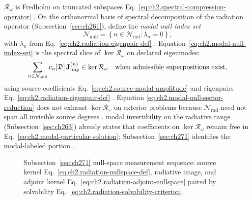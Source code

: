\(\mathcal{R}_\omega\) is Fredholm on truncated subspaces
Eq.~\eqref{eq:ch2.spectral-compression-operator} \cite{harrington2001}.
On the orthonormal basis of spectral decomposition of the radiation operator (Subsection~\ref{sec:ch261}), define
the \emph{modal null index set}
\begin{equation}
\label{eq:ch2.modal-null-index-set}
\mathcal{N}_{\mathrm{null}}
=
\left\{
n\in\mathcal{N}_{\mathrm{rad}}:
\lambda_n=0
\right\},
\end{equation}
with \(\lambda_n\) from Eq.~\eqref{eq:ch2.radiation-eigenpair-def}
\cite{stratton1941}. Equation~\eqref{eq:ch2.modal-null-index-set} is the
spectral slice of \(\ker\mathcal{R}_\omega\) on declared eigenmodes:
\begin{equation}
\label{eq:ch2.modal-null-sector-reduction}
\sum_{n\in\mathcal{N}_{\mathrm{null}}}
c_n[\mathfrak{D}]\,\mathbf{J}_{\mathrm{imp}}^{(n)}
\in\ker\mathcal{R}_\omega
\quad\text{when admissible superpositions exist},
\end{equation}
using source coefficients Eq.~\eqref{eq:ch2.source-modal-amplitude} and eigenpairs
Eq.~\eqref{eq:ch2.radiation-eigenpair-def} \cite{stratton1941}. Equation
\eqref{eq:ch2.modal-null-sector-reduction} does not exhaust \(\ker\mathcal{R}_\omega\) on
exterior problems because \(\mathcal{N}_{\mathrm{rad}}\) need not span all invisible source
degrees \cite{harrington2001}. modal invertibility on the radiative range (Subsection~\ref{sec:ch263})
already states that coefficients on \(\ker\mathcal{R}_\omega\) remain free in
Eq.~\eqref{eq:ch2.modal-particular-solution}; Subsection~\ref{sec:ch271} identifies the
modal-labeled portion \cite{stratton1941}.
\begin{figure}[t]
\centering
{}
\caption{Subsection~\ref{sec:ch271} null-space measurement sequence: source kernel
Eq.~\eqref{eq:ch2.radiation-nullspace-def}, radiative image, and adjoint kernel
Eq.~\eqref{eq:ch2.radiation-adjoint-nullspace} paired by solvability
Eq.~\eqref{eq:ch2.radiation-solvability-criterion}.}
\label{fig:ch2.radiation-nullspace-measurement chain}
\end{figure}
